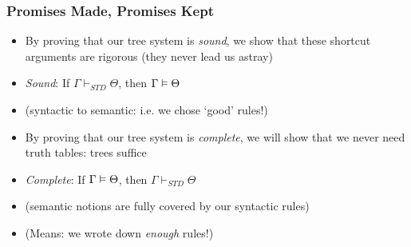 \begin{frame}
\frametitle{Promises Made, Promises Kept}



\begin{itemize}[<+->]

\item By proving that our tree system is \textit{sound}, we show that these shortcut arguments are rigorous (they never lead us astray)

\medskip 

\bi

\item \emph{Sound}: If $\Gamma \vdash_{STD} \Theta$, then $\Gamma \vDash \Theta$

\item (syntactic to semantic: i.e. we chose `good' rules!)

\ei

\bigskip 

\item By proving that our tree system is \textit{complete}, we will show that we never need truth tables: trees suffice

\medskip 

\bi

\item \emph{Complete}: If $\Gamma \vDash \Theta$, then $\Gamma \vdash_{STD} \Theta$

\item (semantic notions are fully covered by our syntactic rules)

\item (Means: we wrote down \textit{enough} rules!)

\ei

\end{itemize}
\end{frame}

